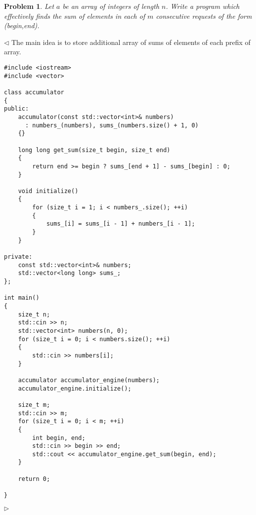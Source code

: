 \documentclass[12pt]{article}
\newtheorem{problem}{Problem}[subsection]
\newenvironment{solution}{\par $\triangleleft$}{$\triangleright$}
\begin{document}
\begin{problem} Let $a$ be an array of integers of length $n$. Write a program
which effectively finds the sum of elements in each of $m$ consecutive requests
of the form (begin,end).
\end{problem}
\begin{solution} The main idea is to store additional array of sums of elements
    of each prefix of array.
    \begin{verbatim}
#include <iostream>
#include <vector>

class accumulator
{
public:
    accumulator(const std::vector<int>& numbers)
      : numbers_(numbers), sums_(numbers.size() + 1, 0)
    {}

    long long get_sum(size_t begin, size_t end)
    {
        return end >= begin ? sums_[end + 1] - sums_[begin] : 0;
    }

    void initialize()
    {
        for (size_t i = 1; i < numbers_.size(); ++i)
        {
            sums_[i] = sums_[i - 1] + numbers_[i - 1];
        }
    }

private:
    const std::vector<int>& numbers;
    std::vector<long long> sums_;
};

int main()
{
    size_t n;
    std::cin >> n;
    std::vector<int> numbers(n, 0);
    for (size_t i = 0; i < numbers.size(); ++i)
    {
        std::cin >> numbers[i];
    }

    accumulator accumulator_engine(numbers);
    accumulator_engine.initialize();

    size_t m;
    std::cin >> m;
    for (size_t i = 0; i < m; ++i)
    {
        int begin, end;
        std::cin >> begin >> end;
        std::cout << accumulator_engine.get_sum(begin, end);
    }

    return 0;

}
    \end{verbatim}
\end{solution}
\end{document}
